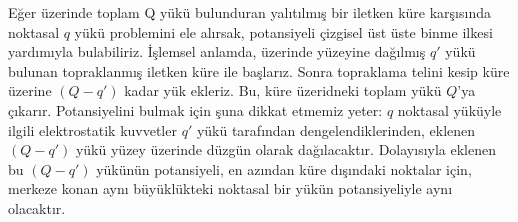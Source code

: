 Eğer üzerinde toplam Q yükü bulunduran yalıtılmış bir iletken küre karşısında noktasal $q$ yükü problemini ele alırsak, potansiyeli çizgisel üst üste binme ilkesi yardımıyla bulabiliriz. İşlemsel anlamda, üzerinde yüzeyine dağılmış $q'$ yükü bulunan topraklanmış iletken küre ile başlarız. Sonra topraklama telini kesip küre üzerine $(Q-q')$ kadar yük ekleriz. Bu, küre üzeridneki toplam yükü $Q$'ya çıkarır. Potansiyelini bulmak için şuna dikkat etmemiz yeter: $q$ noktasal yüküyle ilgili elektrostatik kuvvetler $q'$ yükü tarafından dengelendiklerinden, eklenen $(Q-q')$ yükü yüzey üzerinde düzgün olarak dağılacaktır. Dolayısıyla eklenen bu $(Q-q')$ yükünün potansiyeli, en azından küre dışındaki noktalar için, merkeze konan aynı büyüklükteki noktasal bir yükün potansiyeliyle aynı olacaktır.

\newpage

